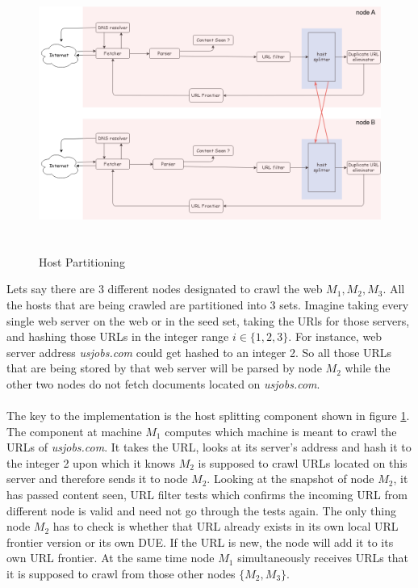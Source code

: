 \begin{figure}[h!]
  \centering
  \includegraphics[width=15cm,height=9cm,keepaspectratio]{../media/crawler/host-splitterv3.png}
  \caption{Host Partitioning}
  \label{fig:hpart}
\end{figure}

\noindent
Lets say there are 3 different nodes designated to crawl the web $M_1, M_2, M_3$. All
the hosts that are being crawled are partitioned into 3 sets. Imagine taking every
single web server on the web or in the seed set, taking the URls for those servers, and hashing those URLs in the integer range $i \in \{1,2,3\}$. For instance, web
server address \textit{usjobs.com} could get hashed to an integer 2. So all those URLs that are being stored by that web server will be parsed by node $M_2$ while the other two nodes do not fetch documents located on \textit{usjobs.com}.
\\
\\
The key to the implementation is the host splitting component shown in figure \ref{fig:hpart}. The component at machine $M_1$ computes which machine is meant to crawl
the URLs of \textit{usjobs.com}. It takes the URL, looks at its server's address and
hash it to the integer 2 upon which it knows $M_2$ is supposed to crawl URLs located
on this server and therefore sends it to node $M_2$. Looking at the snapshot of node $M_2$, it has passed content seen, URL filter tests which confirms the incoming URL
from different node is valid and need not go through the tests again. The only thing node $M_2$ has to check is whether that URL already exists in its own local URL frontier version or its own DUE. If the URL is new, the node will add it to its own URL
frontier. At the same time node $M_1$ simultaneously receives URLs that it is supposed to crawl from those other nodes $\{M_2, M_3\}$.

\pagebreak